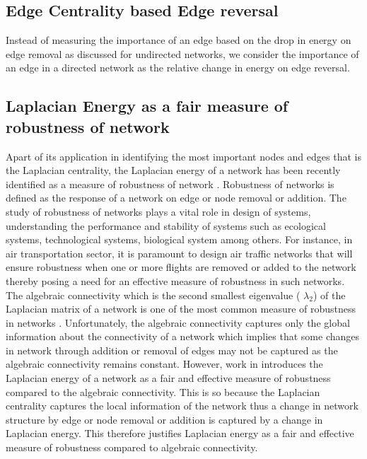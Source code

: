 \documentclass[10pt,a4paper]{article}
\begin{document}
\subsection{Edge Centrality based Edge reversal}
Instead of measuring the importance of an edge based on the drop in energy on edge removal as discussed for undirected networks, we consider the importance of an edge in a directed network as the relative change in energy on edge reversal.

\subsection{Laplacian Energy as a fair measure of robustness of network}
Apart of its application in identifying the most important nodes and edges that is the Laplacian centrality, the Laplacian energy of a network has been recently identified as a measure of robustness of network \citep{yang2016air}. Robustness of networks is defined as the response of a network on edge or node removal or addition. The study of robustness of networks plays a vital role in design of systems, understanding the performance and stability of systems such as ecological systems, technological systems, biological system among others. For instance, in air transportation sector, it is paramount to design air traffic networks that will ensure robustness when one or more flights are removed or added to the network thereby posing a need for an effective measure of robustness in such networks.
The algebraic connectivity which is the second smallest eigenvalue ( $\lambda_2$) of the Laplacian matrix of a network is one of the most common measure of robustness in networks \citep{jamakovic2008robustness,byrne2005algebraic}. Unfortunately, the algebraic connectivity captures only the global information about the connectivity of a network which implies that some changes in network through addition or removal of edges may not be captured as the algebraic connectivity remains constant. However, work in \citep{yang2016air} introduces the Laplacian energy of a network as a fair and effective measure of robustness compared to the algebraic connectivity. This is so because the Laplacian centrality captures the local information of the network thus a change in network structure by edge or node removal or addition is captured by a change in Laplacian energy. This therefore justifies Laplacian energy as a fair and effective measure of robustness compared to algebraic connectivity.
\end{document}
